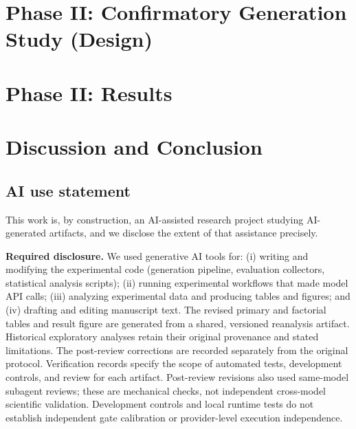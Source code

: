 \documentclass{article}
\begin{document}
\section{Phase II: Confirmatory Generation Study (Design)}\label{sec:phase2}


\section{Phase II: Results}\label{sec:results}


\section{Discussion and Conclusion}\label{sec:discussion}




\label{endofmain}

\subsection*{AI use statement}

This work is, by construction, an AI-assisted research project studying
AI-generated artifacts, and we disclose the extent of that assistance precisely.

\textbf{Required disclosure.} We used generative AI tools for: (i) writing and
modifying the experimental code (generation pipeline, evaluation collectors,
statistical analysis scripts); (ii) running experimental workflows that
made model API calls; (iii) analyzing experimental data and
producing tables and figures; and (iv) drafting and editing manuscript text.
The revised primary and factorial tables and result figure are generated
from a shared, versioned reanalysis artifact. Historical exploratory analyses
retain their original provenance and stated limitations. The post-review
corrections are recorded separately from the original protocol.
Verification records specify the scope of automated tests, development
controls, and review for each artifact. Post-review revisions also used
same-model subagent reviews; these are mechanical checks, not independent
cross-model scientific validation. Development controls and local runtime
tests do not establish independent gate calibration or provider-level
execution independence.
\end{document}
